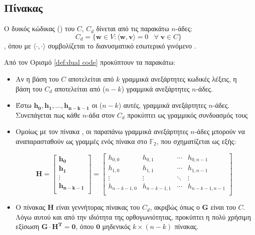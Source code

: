 \subsection{Πίνακας }
\begin{definition}
Ο δυικός κώδικας () του $C$, $C_d$ δίνεται από τις παρακάτω $n$-άδες:$$C_d=\lbrace\mathbf{w}\in V:\langle \mathbf{w,v} \rangle =0\;\;\;\forall\;\mathbf{v}\in C\rbrace$$,
όπου με $\langle\cdot,\cdot\rangle$ συμβολίζεται το διανυσματικό εσωτερικό γινόμενο \cite{ryan2009channel}.
\label{def:dual code}
\end{definition}

Από τον Ορισμό \ref{def:dual code} προκύπτουν τα παρακάτω:

\begin{itemize}
\item Αν η βάση του $C$ αποτελείται από $k$ γραμμικά ανεξάρτητες κωδικές λέξεις, η βάση του $C_d$ αποτελείται από ($n-k$) γραμμικά ανεξάρτητες $n$-άδες.
\item Έστω $\mathbf{h_0, h_1, ..., h_{n-k-1}}$ οι ($n-k$) αυτές, γραμμικά ανεξάρτητες $n$-άδες. Συνεπάγεται πως κάθε $n$-άδα στον $C_d$ προκύπτει ως γραμμικός συνδυασμός τους
\item Ομοίως με τον πίνακα , οι παραπάνω γραμμικά ανεξάρτητες $n$-άδες μπορούν να αναπαρασταθούν ως γραμμές ενός πίνακα στο $\mathbb{F}_2$, που σχηματίζεται ως εξής:

\begin{equation}
\mathbf{H}=\begin{bmatrix}\mathbf{h_0}\\\mathbf{h_1}\\\vdots\\\mathbf{h_{n-k-1}}\\\end{bmatrix}=\begin{bmatrix}h_{0,0} & h_{0,1} & \cdots & h_{0,n-1}\\h_{1,0} & h_{1,1} & \cdots & h_{1,n-1}\\\vdots & \vdots & \ddots & \vdots\\h_{n-k-1,0} & h_{n-k-1,1} & \cdots & h_{n-k-1,n-1}\\\end{bmatrix}
\label{eq:parity check matrix}
\end{equation}
\item Ο πίνακας $\mathbf{H}$ είναι γεννήτορας πίνακας του $C_d$, ακριβώς όπως ο $\mathbf{G}$ είναι του $C$. Λόγω αυτού και από την ιδιότητα της ορθογωνιότητας, προκύπτει η πολύ χρήσιμη εξίσωση $\mathbf{G} \cdot \mathbf{H^T} = \mathbf{0}$, όπου $\mathbf{0}$ μηδενικός $k \times (n-k)$ πίνακας.
\end{itemize}

